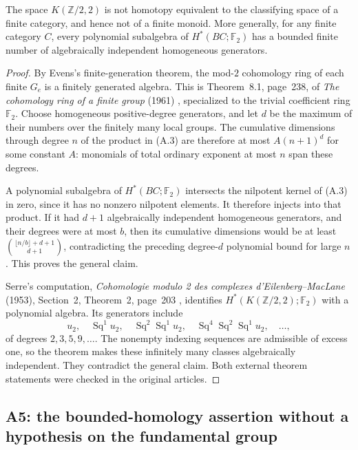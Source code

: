 \begin{corollary}\label{A:K22}
The space $K(\mathbb Z/2,2)$ is not homotopy equivalent to the classifying
space of a finite category, and hence not of a finite monoid.
More generally, for any finite category $C$, every polynomial subalgebra
of $H^*(BC;\mathbb F_2)$ has a bounded finite number of algebraically
independent homogeneous generators.
\end{corollary}
\begin{proof}
By Evens's finite-generation theorem, the mod-$2$ cohomology ring of each
finite $G_e$ is a finitely generated algebra. This is Theorem~8.1, page~238,
of \emph{The cohomology ring of a finite group} (1961) \cite{evens1961}, specialized to the
trivial coefficient ring $\mathbb F_2$. Choose homogeneous positive-degree
generators, and let $d$ be the maximum of their numbers over the finitely
many local groups. The cumulative dimensions through degree $n$ of the
product in (A.3) are therefore at most $A(n+1)^d$ for some constant $A$:
monomials of total ordinary exponent at most $n$ span these degrees.

A polynomial subalgebra of $H^*(BC;\mathbb F_2)$ intersects the nilpotent
kernel of (A.3) in zero, since it has no nonzero nilpotent elements. It
therefore injects into that product. If it had $d+1$ algebraically
independent homogeneous generators, and their degrees were at most $b$,
then its cumulative dimensions would be at least
$\binom{\lfloor n/b\rfloor+d+1}{d+1}$, contradicting the preceding
degree-$d$ polynomial bound for large $n$. This proves the general claim.

Serre's computation, \emph{Cohomologie modulo 2 des complexes
d'Eilenberg--MacLane} (1953), Section~2, Theorem~2, page~203 \cite{serre1953}, identifies
$H^*(K(\mathbb Z/2,2);\mathbb F_2)$ with a polynomial algebra. Its
generators include
\[
 u_2,\quad \operatorname{Sq}^{1}u_2,\quad
 \operatorname{Sq}^{2}\operatorname{Sq}^{1}u_2,\quad
 \operatorname{Sq}^{4}\operatorname{Sq}^{2}\operatorname{Sq}^{1}u_2,
 \quad\ldots,
\]
of degrees $2,3,5,9,\ldots$. The nonempty indexing sequences are
admissible of excess one, so the theorem makes these infinitely many
classes algebraically independent. They contradict the general claim.
Both external theorem statements were checked in the original articles.
\end{proof}

\subsection{A5: the bounded-homology assertion without a hypothesis on the fundamental group}

